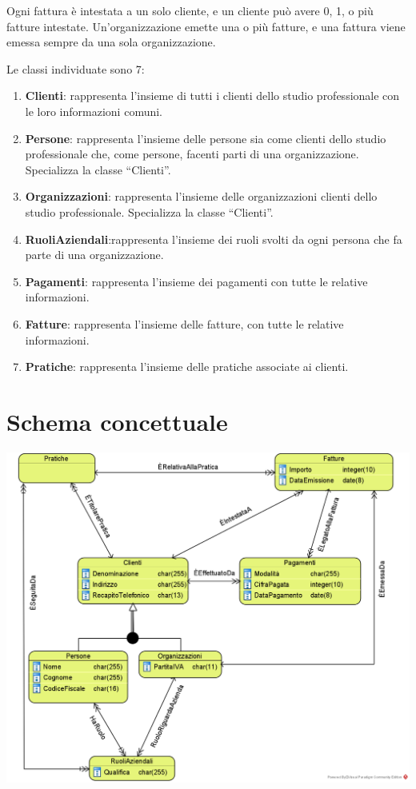 \documentclass[a4paper,12pt]{article}
\begin{document}
Ogni fattura è intestata a un solo cliente, e un cliente può avere 0, 1, o più fatture intestate. Un’organizzazione emette una o più fatture, e una fattura viene emessa sempre da una sola organizzazione.

Le classi individuate sono  7:
\begin{enumerate}
\item \textbf{Clienti}: rappresenta l’insieme di tutti i clienti dello studio professionale con le loro informazioni comuni.
\item \textbf{Persone}: rappresenta l’insieme delle persone sia come clienti dello studio professionale che, come persone, facenti parti di  una organizzazione. Specializza la classe “Clienti”.
\item \textbf{Organizzazioni}: rappresenta l’insieme delle organizzazioni clienti dello studio professionale. Specializza la classe “Clienti”.
\item \textbf{RuoliAziendali}:rappresenta l’insieme dei ruoli svolti da ogni persona che fa parte di una organizzazione.
\item \textbf{Pagamenti}: rappresenta l’insieme dei pagamenti con tutte le relative informazioni.
\item \textbf{Fatture}: rappresenta l’insieme delle fatture, con tutte le relative informazioni.
\item \textbf{Pratiche}: rappresenta l’insieme delle pratiche associate ai clienti.
\end{enumerate}

 \section{ Schema concettuale }

\begin{minipage}{\textwidth}
\begin{center}
\centering 
\centerline{
\includegraphics[width=\textwidth]{ Schema concettuale a oggetti.png }
}
\end{center}
\end{minipage}
\end{document}
